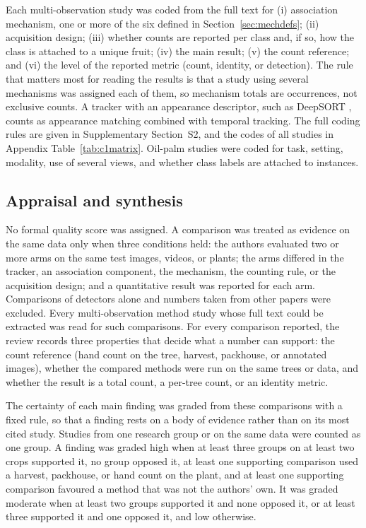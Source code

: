 Each multi-observation study was coded from the full text for (i) association mechanism, one or more of the six defined in Section~\ref{sec:mechdefs}; (ii) acquisition design; (iii) whether counts are reported per class and, if so, how the class is attached to a unique fruit; (iv) the main result; (v) the count reference; and (vi) the level of the reported metric (count, identity, or detection). The rule that matters most for reading the results is that a study using several mechanisms was assigned each of them, so mechanism totals are occurrences, not exclusive counts. A tracker with an appearance descriptor, such as DeepSORT \citep{wojke2017simple}, counts as appearance matching combined with temporal tracking. The full coding rules are given in Supplementary Section~S2, and the codes of all \nMulti studies in Appendix Table~\ref{tab:c1matrix}. Oil-palm studies were coded for task, setting, modality, use of several views, and whether class labels are attached to instances.

\subsection{Appraisal and synthesis}\label{sec:appraisal}
No formal quality score was assigned. A comparison was treated as evidence on the same data only when three conditions held: the authors evaluated two or more arms on the same test images, videos, or plants; the arms differed in the tracker, an association component, the mechanism, the counting rule, or the acquisition design; and a quantitative result was reported for each arm. Comparisons of detectors alone and numbers taken from other papers were excluded. Every multi-observation method study whose full text could be extracted was read for such comparisons. For every comparison reported, the review records three properties that decide what a number can support: the count reference (hand count on the tree, harvest, packhouse, or annotated images), whether the compared methods were run on the same trees or data, and whether the result is a total count, a per-tree count, or an identity metric.

The certainty of each main finding was graded from these comparisons with a fixed rule, so that a finding rests on a body of evidence rather than on its most cited study. Studies from one research group or on the same data were counted as one group. A finding was graded high when at least three groups on at least two crops supported it, no group opposed it, at least one supporting comparison used a harvest, packhouse, or hand count on the plant, and at least one supporting comparison favoured a method that was not the authors' own. It was graded moderate when at least two groups supported it and none opposed it, or at least three supported it and one opposed it, and low otherwise.

